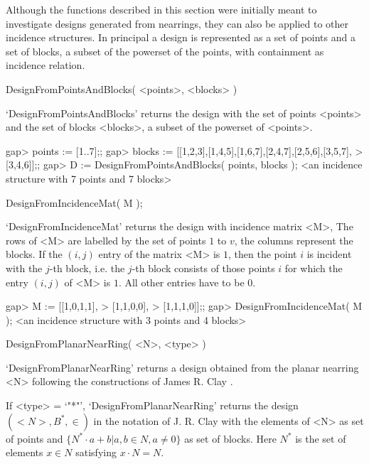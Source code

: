 %
%

Although the functions described in this section were initially meant to
investigate designs generated from nearrings, they can also be applied to
other incidence structures. In principal a design is represented as a set
of points and a set of blocks, a subset of the powerset of the points, with
containment as incidence relation.



\>DesignFromPointsAndBlocks( <points>, <blocks> )

`DesignFromPointsAndBlocks' returns the design with the set of points 
<points> and the set of blocks <blocks>, a subset of the powerset of 
<points>. 

\beginexample
    gap> points := [1..7];;
    gap> blocks := [[1,2,3],[1,4,5],[1,6,7],[2,4,7],[2,5,6],[3,5,7],       
    >                                                          [3,4,6]];;  
    gap> D := DesignFromPointsAndBlocks( points, blocks );                 
    <an incidence structure with 7 points and 7 blocks>
\endexample

\>DesignFromIncidenceMat( M );

`DesignFromIncidenceMat' returns the design with incidence matrix <M>,
The rows of <M> are labelled by the set of points $1$ to $v$, the
columns represent the blocks.
If the $( i, j )$ entry of the matrix <M> is $1$, then the point $i$ is 
incident with the $j$-th block, i.e. the $j$-th block consists of those
points $i$ for which the entry $( i, j )$ of <M> is $1$. All other entries 
have to be $0$.

\beginexample
    gap> M := [[1,0,1,1],
    >          [1,1,0,0],
    >          [1,1,1,0]];;
    gap> DesignFromIncidenceMat( M ); 
    <an incidence structure with 3 points and 4 blocks>
\endexample

\>DesignFromPlanarNearRing( <N>, <type> )

`DesignFromPlanarNearRing' returns a design obtained from the planar 
nearring <N> following the constructions of James R. Clay
\cite{Clay:Nearrings}.

If <type> = `"*"', `DesignFromPlanarNearRing' returns the design 
$(<N>,B^{*},\in)$ in the notation of J. R. Clay with the elements of <N> as 
set of points and $\{N^{*}\cdot a+b | a,b\in N, a \not= 0 \}$ as set of blocks.
Here $N^{*}$ is the set of elements $x\in N$ satisfying $x\cdot N = N$.

